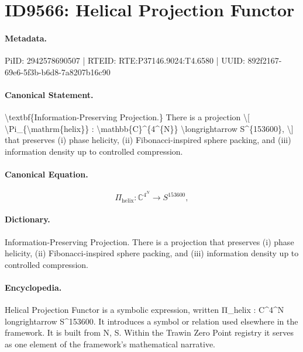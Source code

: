 \section*{ID9566: Helical Projection Functor}
\paragraph{Metadata.}
PiID: 2942578690507 | RTEID: RTE:P37146.9024:T4.6580 | UUID: 892f2167-69e6-5f3b-b6d8-7a8207b16c90

\paragraph{Canonical Statement.}
\textbackslash{}textbf\{Information-Preserving Projection.\} There is a projection \textbackslash{}[ \textbackslash{}Pi\_\{\textbackslash{}mathrm\{helix\}\} : \textbackslash{}mathbb\{C\}\textasciicircum{}\{4\textasciicircum{}\{N\}\} \textbackslash{}longrightarrow S\textasciicircum{}\{153600\}, \textbackslash{}] that preserves (i) phase helicity, (ii) Fibonacci-inspired sphere packing, and (iii) information density up to controlled compression.

\paragraph{Canonical Equation.}
\[
\Pi_{\mathrm{helix}} : \mathbb{C}^{4^{N}} \longrightarrow S^{153600},
\]

\paragraph{Dictionary.}
Information-Preserving Projection. There is a projection that preserves (i) phase helicity, (ii) Fibonacci-inspired sphere packing, and (iii) information density up to controlled compression.

\paragraph{Encyclopedia.}
Helical Projection Functor is a symbolic expression, written Π\_helix : C\textasciicircum{}4\textasciicircum{}N longrightarrow S\textasciicircum{}153600. It introduces a symbol or relation used elsewhere in the framework. It is built from N, S. Within the Trawin Zero Point registry it serves as one element of the framework's mathematical narrative.
